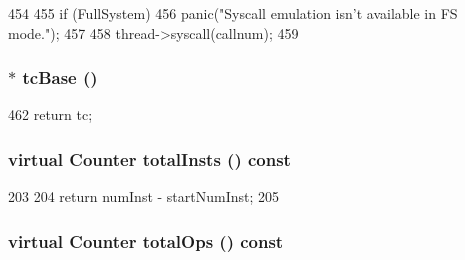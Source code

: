 \begin{DoxyCode}
454     {
455         if (FullSystem)
456             panic("Syscall emulation isn't available in FS mode.\n");
457 
458         thread->syscall(callnum);
459     }
\end{DoxyCode}
\hypertarget{classBaseSimpleCPU_ad33756f3e96ee445dca8d69b1dd8709c}{
\subsubsection[{tcBase}]{$\ast$ tcBase ()}}
\label{classBaseSimpleCPU_ad33756f3e96ee445dca8d69b1dd8709c}



\begin{DoxyCode}
462 { return tc; }
\end{DoxyCode}
\hypertarget{classBaseSimpleCPU_abdcc0de01ff3d8d22a40e0b966acb463}{
\subsubsection[{totalInsts}]{\setlength{\rightskip}{0pt plus 5cm}virtual {\bf Counter} totalInsts () const}}
\label{classBaseSimpleCPU_abdcc0de01ff3d8d22a40e0b966acb463}



\begin{DoxyCode}
203     {
204         return numInst - startNumInst;
205     }
\end{DoxyCode}
\hypertarget{classBaseSimpleCPU_adfb528b512cf037ade8dc8e22bf8a7bd}{
\subsubsection[{totalOps}]{\setlength{\rightskip}{0pt plus 5cm}virtual {\bf Counter} totalOps () const}}
\label{classBaseSimpleCPU_adfb528b512cf037ade8dc8e22bf8a7bd}



